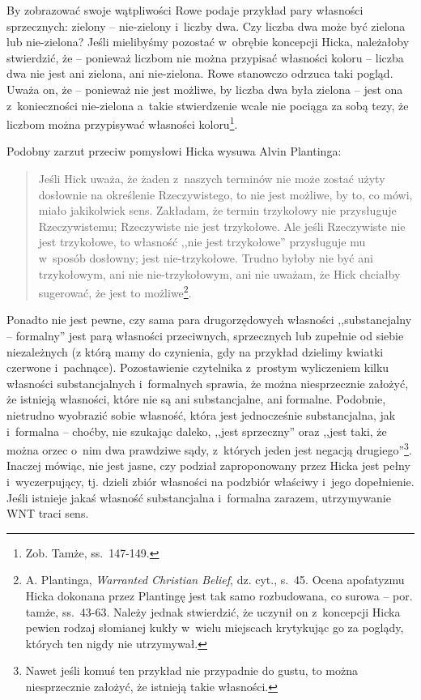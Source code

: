 By zobrazować swoje wątpliwości Rowe podaje przykład pary własności sprzecznych: zielony -- nie-zielony i~liczby dwa. Czy liczba dwa może być zielona lub nie-zielona? Jeśli mielibyśmy pozostać w~obrębie koncepcji Hicka, należałoby stwierdzić, że -- ponieważ liczbom nie można przypisać własności koloru -- liczba dwa nie jest ani zielona, ani nie-zielona. Rowe stanowczo odrzuca taki pogląd. Uważa on, że -- ponieważ nie jest możliwe, by liczba dwa była zielona -- jest ona z~konieczności nie-zielona a~takie stwierdzenie wcale nie pociąga za sobą tezy, że liczbom można przypisywać własności koloru\footnote{Zob. Tamże, ss.~147-149.}.

Podobny zarzut przeciw pomysłowi Hicka wysuwa Alvin Plantinga:

\begin{quote}
Jeśli Hick uważa, że żaden z~naszych terminów nie może zostać użyty dosłownie na określenie Rzeczywistego, to nie jest możliwe, by to, co mówi, miało jakikolwiek sens. Zakładam, że termin trzykołowy nie przysługuje Rzeczywistemu; Rzeczywiste nie jest trzykołowe. Ale jeśli Rzeczywiste nie jest trzykołowe, to własność ,,nie jest trzykołowe'' przysługuje mu w~sposób dosłowny; jest nie-trzykołowe. Trudno byłoby nie być ani trzykołowym, ani nie nie-trzykołowym, ani nie uważam, że Hick chciałby sugerować, że jest to możliwe\footnote{A. Plantinga, \textit{Warranted Christian Belief}, dz. cyt., s.~45. Ocena apofatyzmu Hicka dokonana przez Plantingę jest tak samo rozbudowana, co surowa -- por. tamże, ss.~43-63. Należy jednak stwierdzić, że uczynił on z~koncepcji Hicka pewien rodzaj słomianej kukły w~wielu miejscach krytykując go za poglądy, których ten nigdy nie utrzymywał.}.
\end{quote}

Ponadto nie jest pewne, czy sama para drugorzędowych własności ,,substancjalny -- formalny'' jest parą własności przeciwnych, sprzecznych lub zupełnie od siebie niezależnych (z którą mamy do czynienia, gdy na przykład dzielimy kwiatki czerwone i~pachnące). Pozostawienie czytelnika z~prostym wyliczeniem kilku własności substancjalnych i~formalnych sprawia, że można niesprzecznie założyć, że istnieją własności, które nie są ani substancjalne, ani formalne. Podobnie, nietrudno wyobrazić sobie własność, która jest jednocześnie substancjalna, jak i~formalna -- choćby, nie szukając daleko, ,,jest sprzeczny'' oraz ,,jest taki, że można orzec o~nim dwa prawdziwe sądy, z~których jeden jest negacją drugiego''\footnote{Nawet jeśli komuś ten przykład nie przypadnie do gustu, to można niesprzecznie założyć, że istnieją takie własności.}. Inaczej mówiąc, nie jest jasne, czy podział zaproponowany przez Hicka jest pełny i~wyczerpujący, tj. dzieli zbiór własności na podzbiór właściwy i~jego dopełnienie. Jeśli istnieje jakaś własność substancjalna i~formalna zarazem, utrzymywanie WNT traci sens.

